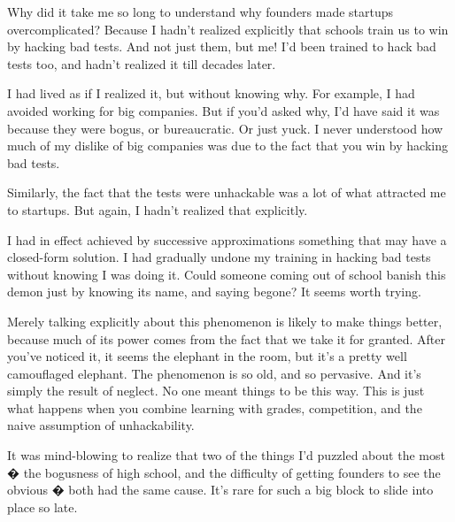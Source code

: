 Why did it take me so long to
                  understand why founders made startups overcomplicated? Because
                  I hadn't realized explicitly that schools train us to win by
                  hacking bad tests. And not just them, but me! I'd been trained
                  to hack bad tests too, and hadn't realized it till decades
                  later.

I had lived as if I realized it, but without
                  knowing why. For example, I had avoided working for big
                  companies. But if you'd asked why, I'd have said it was
                  because they were bogus, or bureaucratic. Or just yuck. I
                  never understood how much of my dislike of big companies was
                  due to the fact that you win by hacking bad tests.

Similarly,
                  the fact that the tests were unhackable was a lot of what
                  attracted me to startups. But again, I hadn't realized that
                  explicitly.

I had in effect achieved by successive
                  approximations something that may have a closed-form solution.
                  I had gradually undone my training in hacking bad tests
                  without knowing I was doing it. Could someone coming out of
                  school banish this demon just by knowing its name, and saying
                  begone? It seems worth trying.

Merely talking
                  explicitly about this phenomenon is likely to make things
                  better, because much of its power comes from the fact that we
                  take it for granted. After you've noticed it, it seems the
                  elephant in the room, but it's a pretty well camouflaged
                  elephant. The phenomenon is so old, and so pervasive. And it's
                  simply the result of neglect. No one meant things to be this
                  way. This is just what happens when you combine learning with
                  grades, competition, and the naive assumption of
                  unhackability.

It was mind-blowing to realize that
                  two of the things I'd puzzled about the most � the bogusness
                  of high school, and the difficulty of getting founders to see
                  the obvious � both had the same cause. It's rare for such a
                  big block to slide into place so late.


